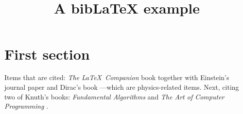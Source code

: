 \documentclass{article}
\title{A bibLaTeX example}
\begin{document}
\section{First section}

Items that are cited: \textit{The \LaTeX\ Companion} book \textcite{latexcompanion} together with Einstein's journal paper \cite{einstein} and Dirac's book \parencite{dirac}---which are physics-related items. Next, citing two of Knuth's books: \textit{Fundamental Algorithms} \cite{knuth-fa} and \textit{The Art of Computer Programming} \cite{knuth-acp}.

\medskip

\printbibliography
\end{document}
